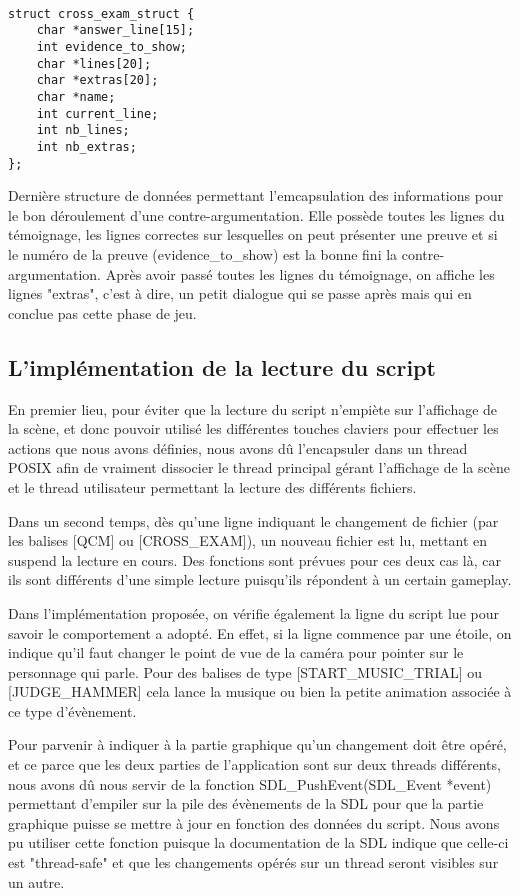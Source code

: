 \begin{verbatim}

struct cross_exam_struct {
	char *answer_line[15];
	int evidence_to_show;
	char *lines[20];
	char *extras[20];
	char *name;
	int current_line;
	int nb_lines;
	int nb_extras;
};

\end{verbatim}

	Dernière structure de données permettant l'emcapsulation des informations pour le bon déroulement d'une contre-argumentation. Elle possède toutes les lignes du témoignage, les lignes correctes sur lesquelles on peut présenter une preuve et si le numéro de la preuve (evidence_to_show) est la bonne fini la contre-argumentation. Après avoir passé toutes les lignes du témoignage, on affiche les lignes "extras", c'est à dire, un petit dialogue qui se passe après mais qui en conclue pas cette phase de jeu.
	
\subsection{L'implémentation de la lecture du script}
	
	En premier lieu, pour éviter que la lecture du script n'empiète sur l'affichage de la scène, et donc pouvoir utilisé les différentes touches claviers pour effectuer les actions que nous avons définies, nous avons dû l'encapsuler dans un thread POSIX afin de vraiment dissocier le thread principal gérant l'affichage de la scène et le thread utilisateur permettant la lecture des différents fichiers.\newline
	
	Dans un second temps, dès qu'une ligne indiquant le changement de fichier (par les balises [QCM] ou [CROSS_EXAM]), un nouveau fichier est lu, mettant en suspend la lecture en cours. Des fonctions sont prévues pour ces deux cas là, car ils sont différents d'une simple lecture puisqu'ils répondent à un certain gameplay.\newline
	
	Dans l'implémentation proposée, on vérifie également la ligne du script lue pour savoir le comportement a adopté. En effet, si la ligne commence par une étoile, on indique qu'il faut changer le point de vue de la caméra pour pointer sur le personnage qui parle.\newline
	Pour des balises de type [START_MUSIC_TRIAL] ou [JUDGE_HAMMER] cela lance la musique ou bien la petite animation associée à ce type d'évènement.\newline
	
	Pour parvenir à indiquer à la partie graphique qu'un changement doit être opéré, et ce parce que les deux parties de l'application sont sur deux threads différents, nous avons dû nous servir de la fonction SDL_PushEvent(SDL_Event *event) permettant d'empiler sur la pile des évènements de la SDL pour que la partie graphique puisse se mettre à jour en fonction des données du script. Nous avons pu utiliser cette fonction puisque la documentation de la SDL indique que celle-ci est "thread-safe" et que les changements opérés sur un thread seront visibles sur un autre.